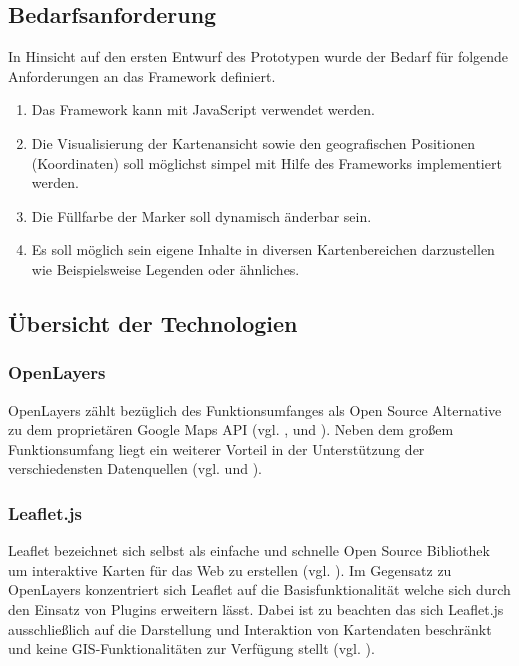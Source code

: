 \documentclass[../Bachelorarbeit.tex]{subfiles}
\begin{document}
\subsection{Bedarfsanforderung}
\label{Bedarf}
In Hinsicht auf den ersten Entwurf des Prototypen wurde der Bedarf für folgende Anforderungen an das Framework definiert.
\begin{enumerate}
	\item Das Framework kann mit JavaScript verwendet werden.
	\item Die Visualisierung der Kartenansicht sowie den geografischen Positionen (Koordinaten) soll möglichst simpel mit Hilfe des Frameworks implementiert werden.
	\item Die Füllfarbe der Marker soll dynamisch änderbar sein.
	\item Es soll möglich sein eigene Inhalte in diversen Kartenbereichen darzustellen wie Beispielsweise Legenden oder ähnliches.
\end{enumerate}
 
\subsection{Übersicht der Technologien}

\subsubsection{OpenLayers}
OpenLayers zählt bezüglich des Funktionsumfanges als Open Source Alternative zu dem proprietären Google Maps \ac{API} (vgl. \cite{OpenlayersInfoSheet}, und \cite{VergleichApi}).
Neben dem großem Funktionsumfang liegt ein weiterer Vorteil in der Unterstützung der verschiedensten Datenquellen (vgl. \cite{Openlayers} und \cite[Abschnitt: Data Sources]{OpenlayersInfoSheet}). 

\subsubsection{Leaflet.js}
Leaflet bezeichnet sich selbst als einfache und schnelle Open Source Bibliothek um interaktive Karten für das Web zu erstellen (vgl. \cite{Leaflet}). 
Im Gegensatz zu OpenLayers konzentriert sich Leaflet auf die Basisfunktionalität welche sich durch den Einsatz von Plugins erweitern lässt.
Dabei ist zu beachten das sich Leaflet.js ausschließlich auf die Darstellung und Interaktion von Kartendaten beschränkt und keine \ac{GIS}-Funktionalitäten zur Verfügung stellt (vgl. \cite[Abschnitt: What Leaflet does not do]{LeafletMakeAMap}). 
\end{document}

